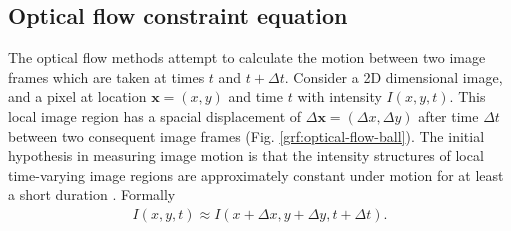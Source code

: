 \documentclass[letterpaper,11pt]{article}
\begin{document}
\subsection{Optical flow constraint equation}
The optical flow methods attempt to calculate the motion between two image frames which are taken at times $t$ and $t + \Delta t$. Consider a 2D dimensional image, and a pixel at location $\mathbf{x} = (x,y)$ and time $t$ with intensity $I(x,y,t)$. This local image region has a spacial displacement of $\Delta \mathbf{x} = (\Delta x, \Delta y)$ after time $\Delta t$ between two consequent image frames (Fig. \ref{grf:optical-flow-ball}). The initial hypothesis in measuring image motion is that the intensity structures of local time-varying image regions are approximately constant under motion for at least a short duration \citep{Beauchemin:1995,Horn:Schunck:1981}. Formally
\begin{align}
I(x,y,t) \approx I(x + \Delta x, y + \Delta y, t + \Delta t).
\label{eq:intensity-cond}
\end{align}
\end{document}
